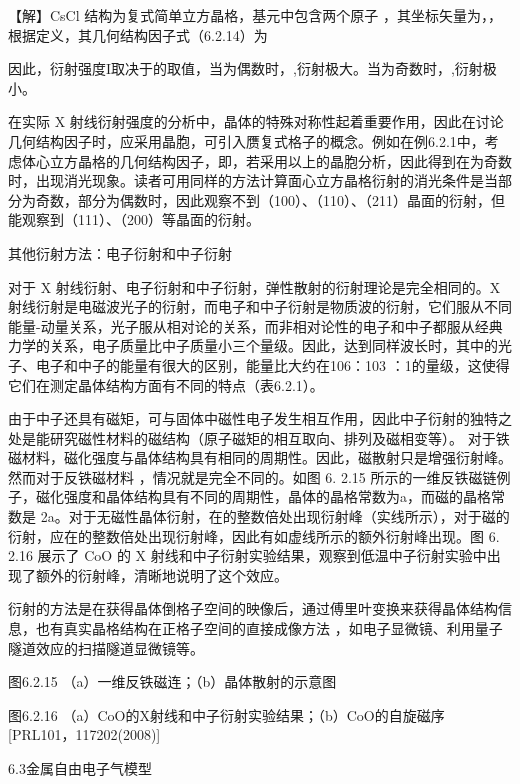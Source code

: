 【解】CsCl 结构为复式简单立方晶格，基元中包含两个原子 ，其坐标矢量为，，根据定义，其几何结构因子式（6.2.14）为



因此，衍射强度I取决于的取值，当为偶数时，,衍射极大。当为奇数时，,衍射极小。

在实际 X 射线衍射强度的分析中，晶体的特殊对称性起着重要作用，因此在讨论几何结构因子时，应采用晶胞，可引入赝复式格子的概念。例如在例6.2.1中，考虑体心立方晶格的几何结构因子，即，若采用以上的晶胞分析，因此得到在为奇数时，出现消光现象。读者可用同样的方法计算面心立方晶格衍射的消光条件是当部分为奇数，部分为偶数时，因此观察不到（100）、（110）、（211）晶面的衍射，但能观察到（111）、（200）等晶面的衍射。

其他衍射方法：电子衍射和中子衍射

对于 X 射线衍射、电子衍射和中子衍射，弹性散射的衍射理论是完全相同的。X 射线衍射是电磁波光子的衍射，而电子和中子衍射是物质波的衍射，它们服从不同能量-动量关系，光子服从相对论的关系，而非相对论性的电子和中子都服从经典力学的关系，电子质量比中子质量小三个量级。因此，达到同样波长时，其中的光子、电子和中子的能量有很大的区别，能量比大约在106：103 ：1的量级，这使得它们在测定晶体结构方面有不同的特点（表6.2.1）。



由于中子还具有磁矩，可与固体中磁性电子发生相互作用，因此中子衍射的独特之处是能研究磁性材料的磁结构（原子磁矩的相互取向、排列及磁相变等）。 对于铁磁材料，磁化强度与晶体结构具有相同的周期性。因此，磁散射只是增强衍射峰。然而对于反铁磁材料 ，情况就是完全不同的。如图 6. 2.15 所示的一维反铁磁链例子，磁化强度和晶体结构具有不同的周期性，晶体的晶格常数为a，而磁的晶格常数是 2a。对于无磁性晶体衍射，在的整数倍处出现衍射峰（实线所示），对于磁的衍射，应在的整数倍处出现衍射峰，因此有如虚线所示的额外衍射峰出现。图 6. 2.16 展示了 CoO 的 X 射线和中子衍射实验结果，观察到低温中子衍射实验中出现了额外的衍射峰，清晰地说明了这个效应。

衍射的方法是在获得晶体倒格子空间的映像后，通过傅里叶变换来获得晶体结构信息，也有真实晶格结构在正格子空间的直接成像方法 ，如电子显微镜、利用量子隧道效应的扫描隧道显微镜等。



图6.2.15 （a）一维反铁磁连；（b）晶体散射的示意图



图6.2.16 （a）CoO的X射线和中子衍射实验结果；（b）CoO的自旋磁序[PRL101，117202(2008)]





6.3金属自由电子气模型


